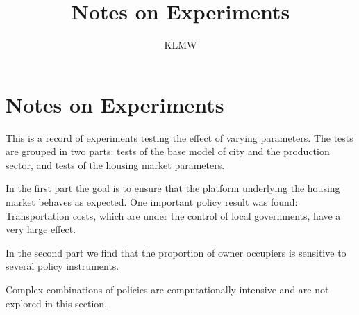 \documentclass{article}
\title{Notes on Experiments}
\author{KLMW}
\begin{document}
\maketitle
\tableofcontents \newpage
\section{Notes on Experiments}
This is a record of experiments testing the effect of  varying parameters. The tests are grouped in two parts: tests of the base model of city and the production sector, and tests of the housing market parameters. 

In the first part the goal is to ensure that the platform underlying the housing market behaves as expected. One important policy result was found: Transportation costs, which are under the control of local governments, have a very large effect.

In the second part we find that the proportion of owner occupiers is sensitive to  several policy instruments. 

Complex combinations of policies are computationally  intensive and are not explored in this section.

\vspace{.5cm}
\end{document}

